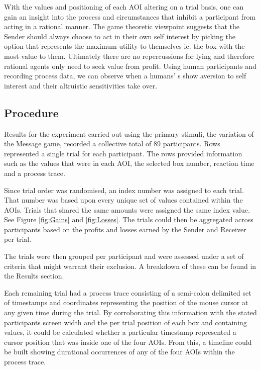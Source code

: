 \documentclass[man, floatsintext]{apa7}
\begin{document}
With the values and positioning of each AOI altering on a trial basis, one can gain an insight into the process and circumstances that inhibit a participant from acting in a rational manner. The game theoretic viewpoint suggests that the Sender should always choose to act in their own self interest by picking the option that represents the maximum utility to themselves ie. the box with the most value to them. Ultimately there are no repercussions for lying and therefore rational agents only need to seek value from profit. Using human participants and recording process data, we can observe when a humans' s show aversion to self interest and their altruistic sensitivities take over.

\subsection{Procedure}

Results for the experiment carried out using the primary stimuli, the variation of the Message game, recorded a collective total of 89 participants. Rows represented a single trial for each participant. The rows provided information such as the values that were in each AOI, the selected box number, reaction time and a process trace.

Since trial order was randomised, an index number was assigned to each trial. That number was based upon every unique set of values contained within the AOIs. Trials that shared the same amounts were assigned the same index value. See Figure \ref{fig:Gains} and \ref{fig:Losses}. The trials could then be aggregated across participants based on the profits and losses earned by the Sender and Receiver per trial.

The trials were then grouped per participant and were assessed under a set of criteria that might warrant their exclusion. A breakdown of these can be found in the Results section.

Each remaining trial had a process trace consisting of a semi-colon delimited set of timestamps and coordinates representing the position of the mouse cursor at any given time during the trial.  By corroborating this information with the stated participants screen width and the per trial position of each box and containing values, it could be calculated whether a particular timestamp represented a cursor position that was inside one of the four AOIs. From this, a timeline could be built showing durational occurrences of any of the four AOIs within the process trace.
\end{document}
